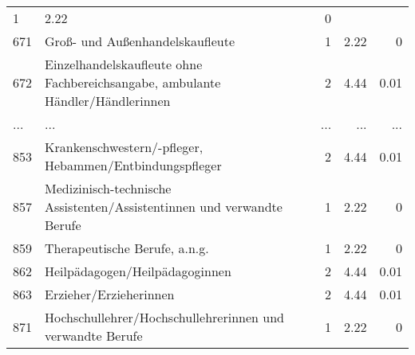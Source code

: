 \begin{longtable}{lXrrr}
          \num{1} &
          \num[round-mode=places,round-precision=2]{2,22} &
          \num[round-mode=places,round-precision=2]{0} \\
        671 & \multicolumn{1}{X}{Groß- und Außenhandelskaufleute} & %
          \num{1} &
          \num[round-mode=places,round-precision=2]{2,22} &
          \num[round-mode=places,round-precision=2]{0} \\
        672 & \multicolumn{1}{X}{Einzelhandelskaufleute ohne Fachbereichsangabe, ambulante Händler/Händlerinnen} & %
          \num{2} &
          \num[round-mode=places,round-precision=2]{4,44} &
          \num[round-mode=places,round-precision=2]{0,01} \\
       ... & ... & ... & ... & ... \\
        853 & \multicolumn{1}{X}{Krankenschwestern/-pfleger, Hebammen/Entbindungspfleger} & %
          \num{2} &
          \num[round-mode=places,round-precision=2]{4,44} &
          \num[round-mode=places,round-precision=2]{0,01} \\

        857 & \multicolumn{1}{X}{Medizinisch-technische Assistenten/Assistentinnen und verwandte Berufe} & %
          \num{1} &
          \num[round-mode=places,round-precision=2]{2,22} &
          \num[round-mode=places,round-precision=2]{0} \\

        859 & \multicolumn{1}{X}{Therapeutische Berufe, a.n.g.} & %
          \num{1} &
          \num[round-mode=places,round-precision=2]{2,22} &
          \num[round-mode=places,round-precision=2]{0} \\

        862 & \multicolumn{1}{X}{Heilpädagogen/Heilpädagoginnen} & %
          \num{2} &
          \num[round-mode=places,round-precision=2]{4,44} &
          \num[round-mode=places,round-precision=2]{0,01} \\

        863 & \multicolumn{1}{X}{Erzieher/Erzieherinnen} & %
          \num{2} &
          \num[round-mode=places,round-precision=2]{4,44} &
          \num[round-mode=places,round-precision=2]{0,01} \\

        871 & \multicolumn{1}{X}{Hochschullehrer/Hochschullehrerinnen und verwandte Berufe} & %
          \num{1} &
          \num[round-mode=places,round-precision=2]{2,22} &
          \num[round-mode=places,round-precision=2]{0} \\


\end{longtable}

